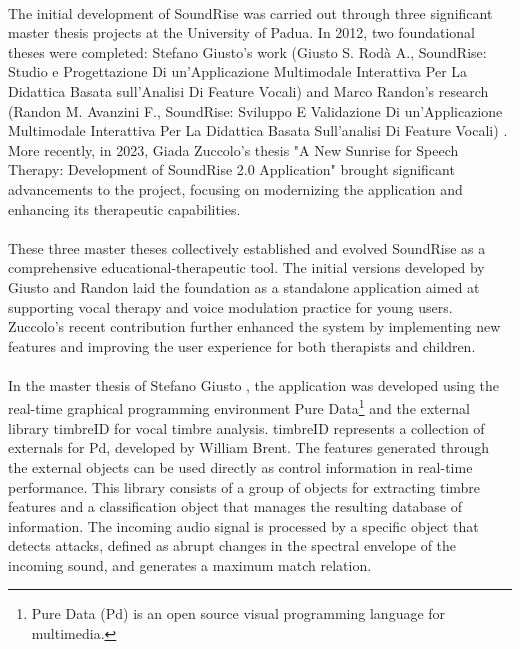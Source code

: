 \paragraph{}
The initial development of SoundRise was carried out through three significant master thesis projects at the University of Padua. In 2012, two foundational theses were completed: Stefano Giusto's work (Giusto S. Rodà A., SoundRise: Studio e Progettazione Di un'Applicazione Multimodale Interattiva Per La Didattica Basata sull'Analisi Di Feature Vocali) \cite{giusto2012} and Marco Randon's research (Randon M. Avanzini F., SoundRise: Sviluppo E Validazione Di un'Applicazione Multimodale Interattiva Per La Didattica Basata Sull'analisi Di Feature Vocali) \cite{randon2012}. More recently, in 2023, Giada Zuccolo's thesis "A New Sunrise for Speech Therapy: Development of SoundRise 2.0 Application" \cite{zuccolo2023} brought significant advancements to the project, focusing on modernizing the application and enhancing its therapeutic capabilities.

\paragraph{}
These three master theses collectively established and evolved SoundRise as a comprehensive educational-therapeutic tool. The initial versions developed by Giusto and Randon laid the foundation as a standalone application aimed at supporting vocal therapy and voice modulation practice for young users. Zuccolo's recent contribution further enhanced the system by implementing new features and improving the user experience for both therapists and children.

\paragraph{}
In the master thesis of Stefano Giusto \cite{giusto2012}, the application was developed using the real-time graphical programming environment Pure Data\footnote{Pure Data (Pd) is an open source visual programming language for multimedia.} \cite{puredata2015} and the external library timbreID for vocal timbre analysis. timbreID \cite{timbreid2016} represents a collection of externals for Pd, developed by William Brent. The features generated through the external objects can be used directly as control information in real-time performance. This library consists of a group of objects for extracting timbre features and a classification object that manages the resulting database of information. The incoming audio signal is processed by a specific object that detects attacks, defined as abrupt changes in the spectral envelope of the incoming sound, and generates a maximum match relation.

